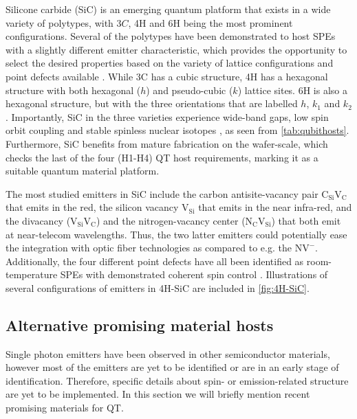 Silicone carbide (SiC) is an emerging quantum platform that exists in a wide variety of polytypes, with $3C$, 4H and 6H being the most prominent configurations. Several of the polytypes have been demonstrated to host SPEs with a slightly different emitter characteristic, which provides the opportunity to select the desired properties based on the variety of lattice configurations and point defects available \cite{Weber2010, Son2020, Falk2013}. While 3C has a cubic structure, 4H has a hexagonal structure with both hexagonal ($h$) and pseudo-cubic ($k$) lattice sites. 6H is also a hexagonal structure, but with the three orientations that are labelled $h$, $k_1$ and $k_2$. Importantly, SiC in the three varieties experience wide-band gaps, low spin orbit coupling and stable spinless nuclear isotopes \cite{Neudeck1995, Weber2010, Martienssen2005}, as seen from \autoref{tab:qubithosts}. Furthermore, SiC benefits from mature fabrication on the wafer-scale, which checks the last of the four (H1-H4) QT host requirements, marking it as a suitable quantum material platform.


The most studied emitters in SiC include the carbon antisite-vacancy pair $\text{C}_{\text{Si}}\text{V}_{\text{C}}$ that emits in the red, the silicon vacancy $\text{V}_{\text{Si}}$ that emits in the near infra-red, and the divacancy ($\text{V}_{\text{Si}}\text{V}_{\text{C}}$) and the nitrogen-vacancy center ($\text{N}_{\text{C}}\text{V}_{\text{Si}}$) that both emit at near-telecom wavelengths. Thus, the two latter emitters could potentially ease the integration with optic fiber technologies as compared to e.g. the $\text{NV}^{-}$. Additionally, the four different point defects have all been identified as room-temperature SPEs with demonstrated coherent spin control \cite{Widmann2014, }. Illustrations of several configurations of emitters in 4H-SiC are included in \autoref{fig:4H-SiC}.

\subsection{Alternative promising material hosts}
\label{promising-material-hosts}

Single photon emitters have been observed in other semiconductor materials, however most of the emitters are yet to be identified or are in an early stage of identification. Therefore, specific details about spin- or emission-related structure are yet to be implemented. In this section we will briefly mention recent promising materials for QT.

